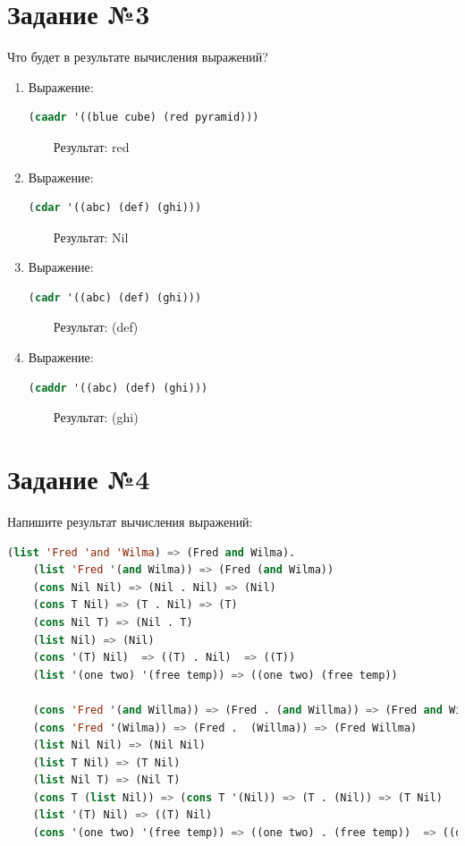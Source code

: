 \section{Задание №3}

Что будет в результате вычисления выражений?

\begin{enumerate}
	\item Выражение:
	\begin{lstlisting}[language=Lisp]
		(caadr '((blue cube) (red pyramid)))
	\end{lstlisting}
	
	~~~~Результат: red
	
	\item Выражение:
	
	\begin{lstlisting}[language=Lisp]
		(cdar '((abc) (def) (ghi)))
	\end{lstlisting}
	
	~~~~Результат: Nil
	
	\item Выражение:
	
	\begin{lstlisting}[language=Lisp]
		(cadr '((abc) (def) (ghi)))
	\end{lstlisting}
	
	~~~~Результат: (def)
	
	\item Выражение:
	
	\begin{lstlisting}[language=Lisp]
		(caddr '((abc) (def) (ghi)))
	\end{lstlisting}
	
	~~~~Результат: (ghi)
\end{enumerate}

\section{Задание №4}

Напишите результат вычисления выражений:

\begin{lstlisting}[language=Lisp]
	(list 'Fred 'and 'Wilma) => (Fred and Wilma). 
	(list 'Fred '(and Wilma)) => (Fred (and Wilma))
	(cons Nil Nil) => (Nil . Nil) => (Nil)
	(cons T Nil) => (T . Nil) => (T)
	(cons Nil T) => (Nil . T)
	(list Nil) => (Nil)
	(cons '(T) Nil)	 => ((T) . Nil)	 => ((T))
	(list '(one two) '(free temp)) => ((one two) (free temp))
	
	(cons 'Fred '(and Willma)) => (Fred . (and Willma)) => (Fred and Willma)
	(cons 'Fred '(Wilma)) => (Fred .  (Willma)) => (Fred Willma)
	(list Nil Nil) => (Nil Nil)
	(list T Nil) => (T Nil)
	(list Nil T) => (Nil T)
	(cons T (list Nil)) => (cons T '(Nil)) => (T . (Nil)) => (T Nil)
	(list '(T) Nil) => ((T) Nil)
	(cons '(one two) '(free temp)) => ((one two) . (free temp))  => ((one two) free temp)
\end{lstlisting}


